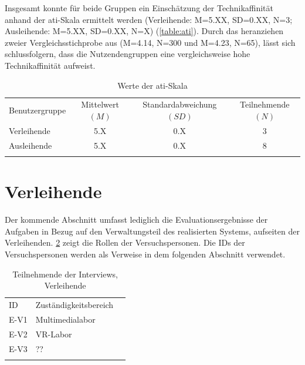 Insgesamt konnte für beide Gruppen ein Einschätzung der Technikaffinität anhand der \ac{ati}-Skala
ermittelt werden (Verleihende: M=5.XX, SD=0.XX, N=3; Ausleihende: M=5.XX, SD=0.XX, N=X)
(\ref{table:ati}). Durch das heranziehen zweier Vergleichsstichprobe aus
 (M=4.14, N=300 und M=4.23, N=65), lässt sich schlussfolgern, dass die
Nutzendengruppen eine vergleichsweise hohe Technikaffinität aufweist.


\begin{table}[h]
  \centering
  \caption{Werte der \ac{ati}-Skala}
  \begin{tabular}{lccc}
    \arrayrulecolor{maincolor}\hline
    \sffamily\color{maincolor}Benutzergruppe & \sffamily\color{maincolor}Mittelwert $(M)$ &
    \sffamily\color{maincolor}Standardabweichung $(SD)$ & \sffamily\color{maincolor}Teilnehmende
    $(N)$ \\
    \arrayrulecolor{maincolor}\hline
    Verleihende                              & 5.X & 0.X & 3 \\
    Ausleihende                              & 5.X & 0.X & 8 \\
    \arrayrulecolor{maincolor}\hline
  \end{tabular}
  \label{table:atipartzwei}
\end{table}


\section{Verleihende}
Der kommende Abschnitt umfasst lediglich die Evaluationsergebnisse der Aufgaben in Bezug auf den
Verwaltungsteil des realisierten Systems, aufseiten der Verleihenden. \ref{table:vzwei} zeigt die
Rollen der Versuchspersonen. Die IDs der Versuchspersonen werden als Verweise in dem folgenden
Abschnitt verwendet.

\begin{table}[h]
  \centering
  \caption{Teilnehmende der Interviews, Verleihende}
  \begin{tabular}{lll}
    \arrayrulecolor{maincolor}\hline
    \sffamily\color{maincolor}ID & \sffamily\color{maincolor}Zuständigkeitsbereich \\
    \arrayrulecolor{maincolor}\hline
    E-V1                         & Multimedialabor
    \\
    E-V2                        & VR-Labor \\
    E-V3                        &  ??\\
    \arrayrulecolor{maincolor}\hline
  \end{tabular}
  \label{table:vzwei}
\end{table}

